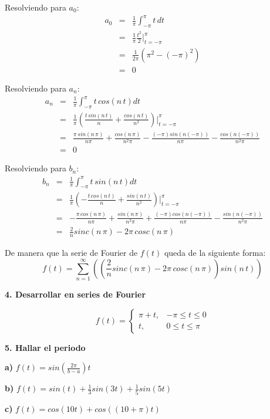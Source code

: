 \documentclass[twocolumn]{article}
\begin{document}
Resolviendo para $a_0$:
\begin{eqnarray*}
a_0 &=& \frac{1}{\pi}\int_{-\pi}^{\pi}t\,dt\\
&=& \frac{1}{\pi} \frac{t^2}{2}\bigg|_{t=-\pi}^{\pi}\\
&=& \frac{1}{2\pi} (\pi^2 - (-\pi)^2)\\
&=& 0
\end{eqnarray*}

Resolviendo para $a_n$:
\begin{eqnarray*}
a_n &=& \frac{1}{\pi}\int_{-\pi}^{\pi}t\,cos(n\,t)dt\\
&=& \frac{1}{\pi} \left(\frac{t\,sin(n\,t)}{n} + \frac{cos(n\,t)}{n^2}\right)\bigg|_{t=-\pi}^{\pi}\\
&=& \frac{\pi\,sin(n\,\pi)}{n\pi} + \frac{cos(n\,\pi)}{n^2\pi} - \frac{(-\pi)sin(n(-\pi))}{n\pi} - \frac{cos(n(-\pi))}{n^2\pi}\\
&=& 0
\end{eqnarray*}

Resolviendo para $b_n$:
\begin{eqnarray*}
b_n &=& \frac{1}{\pi}\int_{-\pi}^{\pi}t\,sin(n\,t)dt\\
&=& \frac{1}{\pi} \left(-\frac{t\,cos(n\,t)}{n} + \frac{sin(n\,t)}{n^2}\right)\bigg|_{t=-\pi}^{\pi}\\
&=& -\frac{\pi\,cos(n\,\pi)}{n\pi} + \frac{sin(n\,\pi)}{n^2\pi} + \frac{(-\pi)cos(n(-\pi))}{n\pi} - \frac{sin(n(-\pi))}{n^2\pi}\\
&=& \frac{2}{n}sinc(n\,\pi) -2\pi\,cosc(n\,\pi)
\end{eqnarray*}

De manera que la serie de Fourier de $f(t)$ queda de la siguiente forma:
$$f(t) = \sum_{n=1}^\infty\left(\left(\frac{2}{n}sinc(n\,\pi) -2\pi\,cosc(n\,\pi)\right)sin(n\,t)\right)$$

\textbf{4. Desarrollar en series de Fourier}

$$f(t) = \begin{cases}
\pi +t, &-\pi \leq t \leq 0\\
t, &0 \leq t \leq \pi
\end{cases}$$

\textbf{5. Hallar el periodo}

\textbf{a)} $f(t) = sin(\frac{2\pi}{b-a})t$

\textbf{b)} $f(t) = sin(t) + \frac{1}{3}sin(3t) + \frac{1}{5}sin(5t)$

\textbf{c)} $f(t) = cos(10t) + cos((10+\pi)t)$
\end{document}
